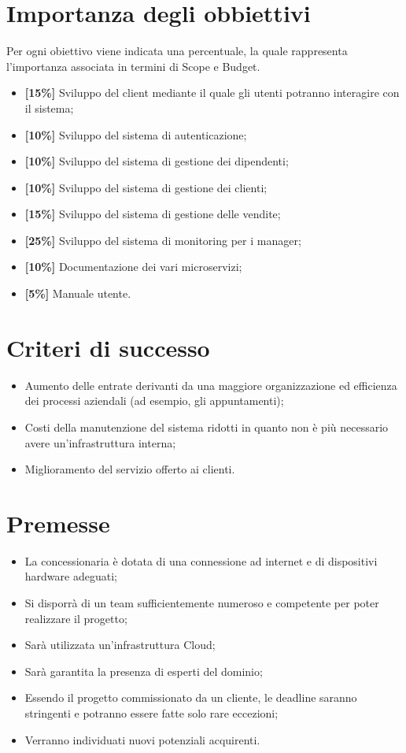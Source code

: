 \documentclass{article}
\begin{document}
  \section*{Importanza degli obbiettivi}
  Per ogni obiettivo viene indicata una percentuale, la quale rappresenta l’importanza associata in
    termini di Scope e Budget.
    \begin{itemize}
        \item \textbf{[15\%]} Sviluppo del client mediante il quale gli utenti potranno interagire con il sistema;
        \item \textbf{[10\%]} Sviluppo del sistema di autenticazione;
        \item \textbf{[10\%]} Sviluppo del sistema di gestione dei dipendenti;
        \item \textbf{[10\%]} Sviluppo del sistema di gestione dei clienti;
        \item \textbf{[15\%]} Sviluppo del sistema di gestione delle vendite;
        \item \textbf{[25\%]} Sviluppo del sistema di monitoring per i manager;
        \item \textbf{[10\%]} Documentazione dei vari microservizi;
        \item \textbf{[5\%]} Manuale utente.
    \end{itemize}
  \section*{Criteri di successo}

  \begin{itemize}
    \item Aumento delle entrate derivanti da una maggiore organizzazione ed efficienza dei processi aziendali
        (ad esempio, gli appuntamenti);
    \item Costi della manutenzione del sistema ridotti in quanto non è più necessario avere 
        un'infrastruttura interna;
    \item Miglioramento del servizio offerto ai clienti.
  \end{itemize}




  \section*{Premesse}
  \begin{itemize}
    \item La concessionaria è dotata di una connessione ad internet e di dispositivi hardware adeguati;
    \item Si disporrà di un team sufficientemente numeroso e competente per poter realizzare il progetto;
    \item Sarà utilizzata un'infrastruttura Cloud;
    \item Sarà garantita la presenza di esperti del dominio;
    \item Essendo il progetto commissionato da un cliente, le deadline saranno stringenti e potranno 
        essere fatte solo rare eccezioni;
    \item Verranno individuati nuovi potenziali acquirenti.
  \end{itemize}
\end{document}
